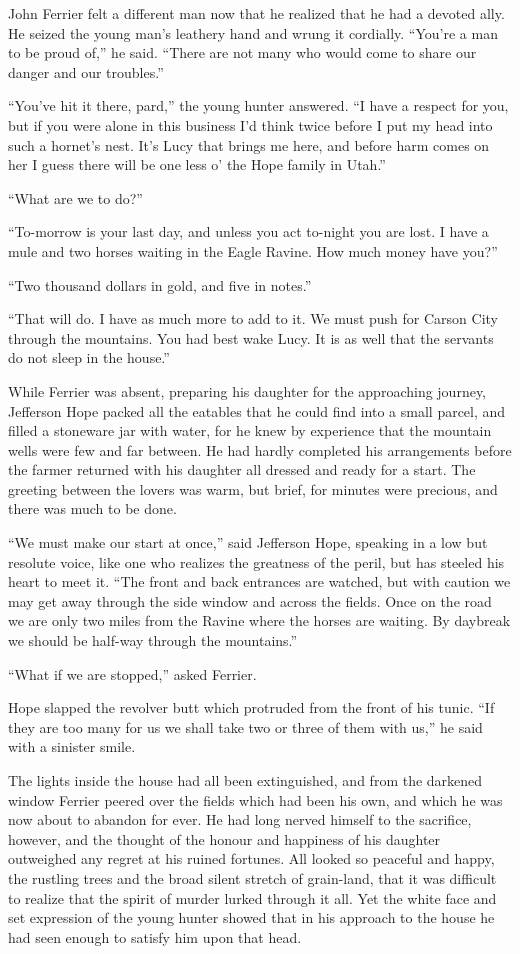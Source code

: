 \documentclass[12pt]{book}
\begin{document}
John Ferrier felt a different man now that he realized that he had a devoted ally. He seized the young man’s leathery hand and wrung it cordially. “You’re a man to be proud of,” he said. “There are not many who would come to share our danger and our troubles.” 

“You’ve hit it there, pard,” the young hunter answered. “I have a respect for you, but if you were alone in this business I’d think twice before I put my head into such a hornet’s nest. It’s Lucy that brings me here, and before harm comes on her I guess there will be one less o’ the Hope family in Utah.” 

“What are we to do?” 

“To-morrow is your last day, and unless you act to-night you are lost. I have a mule and two horses waiting in the Eagle Ravine. How much money have you?” 

“Two thousand dollars in gold, and five in notes.” 

“That will do. I have as much more to add to it. We must push for Carson City through the mountains. You had best wake Lucy. It is as well that the servants do not sleep in the house.” 

While Ferrier was absent, preparing his daughter for the approaching journey, Jefferson Hope packed all the eatables that he could find into a small parcel, and filled a stoneware jar with water, for he knew by experience that the mountain wells were few and far between. He had hardly completed his arrangements before the farmer returned with his daughter all dressed and ready for a start. The greeting between the lovers was warm, but brief, for minutes were precious, and there was much to be done. 

“We must make our start at once,” said Jefferson Hope, speaking in a low but resolute voice, like one who realizes the greatness of the peril, but has steeled his heart to meet it. “The front and back entrances are watched, but with caution we may get away through the side window and across the fields. Once on the road we are only two miles from the Ravine where the horses are waiting. By daybreak we should be half-way through the mountains.” 

“What if we are stopped,” asked Ferrier. 

Hope slapped the revolver butt which protruded from the front of his tunic. “If they are too many for us we shall take two or three of them with us,” he said with a sinister smile. 

The lights inside the house had all been extinguished, and from the darkened window Ferrier peered over the fields which had been his own, and which he was now about to abandon for ever. He had long nerved himself to the sacrifice, however, and the thought of the honour and happiness of his daughter outweighed any regret at his ruined fortunes. All looked so peaceful and happy, the rustling trees and the broad silent stretch of grain-land, that it was difficult to realize that the spirit of murder lurked through it all. Yet the white face and set expression of the young hunter showed that in his approach to the house he had seen enough to satisfy him upon that head. 
\end{document}

